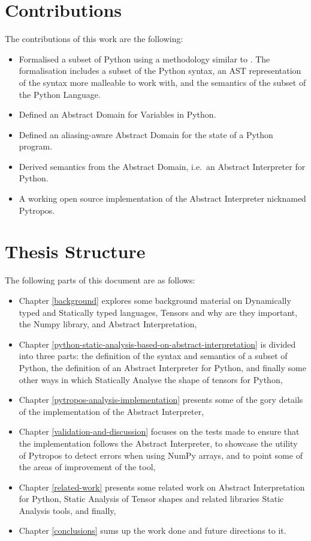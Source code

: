 \documentclass[
11pt, %
english, %
singlespacing, %
headsepline, %
]{MastersDoctoralThesis} %
\providecommand{\tightlist}{%
  \setlength{\itemsep}{0pt}\setlength{\parskip}{0pt}}
\begin{document}
\hypertarget{contributions}{%
\section{Contributions}\label{contributions}}

The contributions of this work are the following:

\begin{itemize}
\tightlist
\item
  Formalised a subset of Python using a methodology similar to
  \autocite{fromherz_static_2018}. The formalisation includes a subset
  of the Python syntax, an AST representation of the syntax more
  malleable to work with, and the semantics of the subset of the Python
  Language.
\item
  Defined an Abstract Domain for Variables in Python.
\item
  Defined an aliasing-aware Abstract Domain for the state of a Python
  program.
\item
  Derived semantics from the Abstract Domain, i.e.~an Abstract
  Interpreter for Python.
\item
  A working open source implementation of the Abstract Interpreter
  nicknamed Pytropos.
\end{itemize}

\hypertarget{thesis-structure}{%
\section{Thesis Structure}\label{thesis-structure}}

The following parts of this document are as follows:

\begin{itemize}
\tightlist
\item
  Chapter \ref{background} explores some background material on
  Dynamically typed and Statically typed languages, Tensors and why are
  they important, the Numpy library, and Abstract Interpretation,
\item
  Chapter \ref{python-static-analysis-based-on-abstract-interpretation}
  is divided into three parts: the definition of the syntax and
  semantics of a subset of Python, the definition of an Abstract
  Interpreter for Python, and finally some other ways in which
  Statically Analyse the shape of tensors for Python,
\item
  Chapter \ref{pytropos-analysis-implementation} presents some of the
  gory details of the implementation of the Abstract Interpreter,
\item
  Chapter \ref{validation-and-discussion} focuses on the tests made to
  ensure that the implementation follows the Abstract Interpreter, to
  showcase the utility of Pytropos to detect errors when using NumPy
  arrays, and to point some of the areas of improvement of the tool,
\item
  Chapter \ref{related-work} presents some related work on Abstract
  Interpretation for Python, Static Analysis of Tensor shapes and
  related libraries Static Analysis tools, and finally,
\item
  Chapter \ref{conclusions} sums up the work done and future directions
  to it.
\end{itemize}
\end{document}

